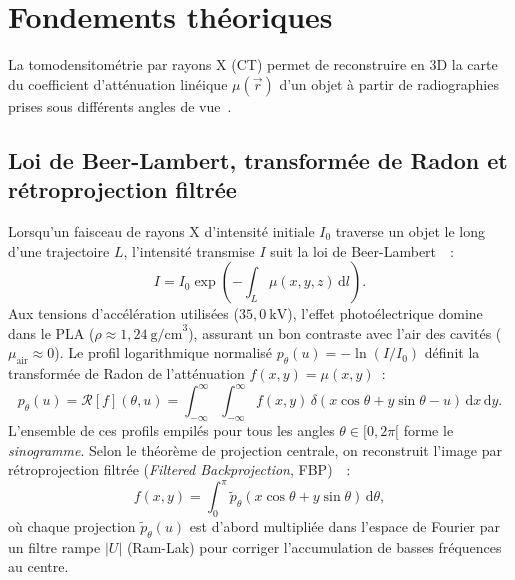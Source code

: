 \section{Fondements théoriques}
\label{sec:theorie}

La tomodensitométrie par rayons X (CT) permet de reconstruire en 3D la carte du coefficient d'atténuation linéique $\mu(\vec{r})$ d'un objet à partir de radiographies prises sous différents angles de vue~\cite{kak1988principles}.

\subsection{Loi de Beer-Lambert, transformée de Radon et rétroprojection filtrée}
Lorsqu'un faisceau de rayons X d'intensité initiale $I_0$ traverse un objet le long d'une trajectoire $L$, l'intensité transmise $I$ suit la loi de Beer-Lambert~\cite{bloch2020reconstruction}~:
\begin{equation}
    I = I_0 \exp\left( - \int_{L} \mu(x, y, z) \, \mathrm{d}l \right).
    \label{eq:beer_lambert}
\end{equation}
Aux tensions d'accélération utilisées ($35{,}0~\text{kV}$), l'effet photoélectrique domine dans le PLA ($\rho \approx 1{,}24~\text{g/cm}^3$), assurant un bon contraste avec l'air des cavités ($\mu_{\text{air}} \approx 0$). Le profil logarithmique normalisé $p_\theta(u) = -\ln(I/I_0)$ définit la transformée de Radon de l'atténuation $f(x, y) = \mu(x, y)$~:
\begin{equation}
    p_\theta(u) = \mathcal{R}[f](\theta, u) = \int_{-\infty}^{\infty} \int_{-\infty}^{\infty} f(x, y) \, \delta(x \cos\theta + y \sin\theta - u) \, \mathrm{d}x \, \mathrm{d}y.
    \label{eq:radon}
\end{equation}
L'ensemble de ces profils empilés pour tous les angles $\theta \in [0, 2\pi[$ forme le \emph{sinogramme}. Selon le théorème de projection centrale, on reconstruit l'image par rétroprojection filtrée (\emph{Filtered Backprojection}, FBP)~\cite{kak1988principles}~:
\begin{equation}
    f(x, y) = \int_{0}^{\pi} \tilde{p}_\theta(x \cos\theta + y \sin\theta) \, \mathrm{d}\theta,
    \label{eq:fbp}
\end{equation}
où chaque projection $\tilde{p}_\theta(u)$ est d'abord multipliée dans l'espace de Fourier par un filtre rampe $|U|$ (Ram-Lak) pour corriger l'accumulation de basses fréquences au centre.

